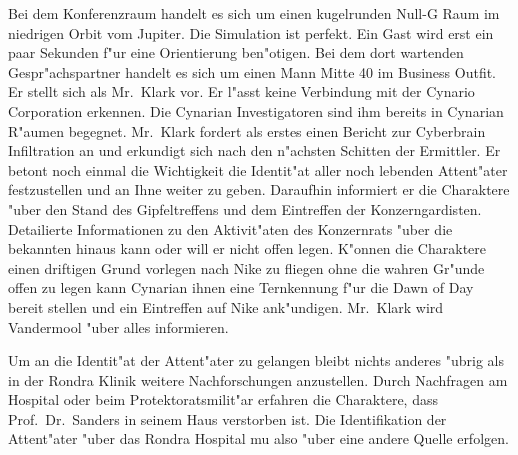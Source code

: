 Bei dem Konferenzraum handelt es sich um einen kugelrunden Null-G Raum im niedrigen Orbit vom Jupiter. Die Simulation ist perfekt. Ein Gast wird erst ein paar Sekunden f"ur eine Orientierung ben"otigen. Bei dem dort wartenden Gespr"achspartner handelt es sich um einen Mann Mitte 40 im Business Outfit. Er stellt sich als Mr.~Klark vor. Er l"asst keine Verbindung mit der Cynario Corporation erkennen. Die Cynarian Investigatoren sind ihm bereits in Cynarian R"aumen begegnet. Mr.~Klark fordert als erstes einen Bericht zur Cyberbrain Infiltration an und erkundigt sich nach den n"achsten Schitten der Ermittler. Er betont noch einmal die Wichtigkeit die Identit"at aller noch lebenden Attent"ater festzustellen und an Ihne weiter zu geben. Daraufhin informiert er die Charaktere "uber den Stand des Gipfeltreffens und dem Eintreffen der Konzerngardisten. Detailierte Informationen zu den Aktivit"aten des Konzernrats "uber die bekannten hinaus kann oder will er nicht offen legen. K"onnen die Charaktere einen driftigen Grund vorlegen nach Nike zu fliegen ohne die wahren Gr"unde offen zu legen kann Cynarian ihnen eine Ternkennung f"ur die Dawn of Day bereit stellen und ein Eintreffen auf Nike ank"undigen. Mr.~Klark wird Vandermool "uber alles informieren.


 Um an die Identit"at der Attent"ater zu gelangen bleibt nichts anderes "ubrig als in der Rondra Klinik weitere Nachforschungen anzustellen. Durch Nachfragen am Hospital oder beim Protektoratsmilit"ar erfahren die Charaktere, dass Prof.~Dr.~Sanders in seinem Haus verstorben ist. Die Identifikation der Attent"ater "uber das Rondra Hospital mu\3 also "uber eine andere Quelle erfolgen.

